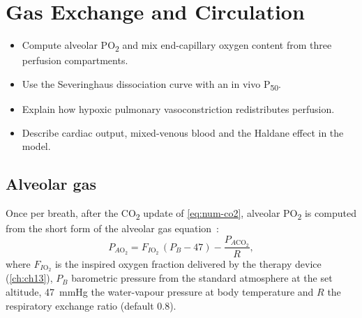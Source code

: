\chapter{Gas Exchange and Circulation}
\label{ch:ch09}

\begin{objectives}
\begin{itemize}[leftmargin=*]
  \item Compute alveolar PO\textsubscript{2} and mix end-capillary oxygen content from three perfusion compartments.
  \item Use the Severinghaus dissociation curve with an in vivo P\textsubscript{50}.
  \item Explain how hypoxic pulmonary vasoconstriction redistributes perfusion.
  \item Describe cardiac output, mixed-venous blood and the Haldane effect in the model.
\end{itemize}
\end{objectives}

\section{Alveolar gas}
\label{sec:gx-alv}
Once per breath, after the CO\textsubscript{2} update of \cref{eq:num-co2}, alveolar PO\textsubscript{2} is computed from the short form of the alveolar gas equation~\citep{west2012}:
\begin{equation}
P_{A\mathrm{O_2}} = F_{I\mathrm{O_2}}\,(P_B - 47) - \frac{P_{A\mathrm{CO_2}}}{R},
\label{eq:gx-alv}
\end{equation}
where $F_{I\mathrm{O_2}}$ is the inspired oxygen fraction delivered by the therapy device (\cref{ch:ch13}), $P_B$ barometric pressure from the standard atmosphere at the set altitude, \SI{47}{\mmHg} the water-vapour pressure at body temperature and $R$ the respiratory exchange ratio (default 0.8).

